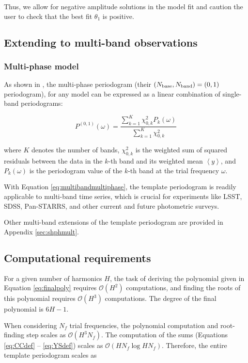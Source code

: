 \documentclass{aastex62}
\newcommand{\bigO}{\mathcal{O}}
\newcommand{\savg}[1]{\left<#1\right>}
\begin{document}
Thus, we allow for negative amplitude solutions in the model fit and caution
the user to check that the best fit $\theta_1$ is positive.


\subsection{Extending to multi-band observations}

\subsubsection{Multi-phase model}
\label{sec:multiband}
As shown in \cite{Vanderplas+Ivezic_2015}, the multi-phase periodogram (their
$(N_{\rm base}, N_{\rm band}) = (0, 1)$ periodogram), for any model can
be expressed as a linear combination of single-band periodograms:

\begin{equation}
\label{eq:multibandmultiphase}
P^{(0,1)}(\omega) = \frac{\sum_{k=1}^K\chi^2_{0, k}P_{k}(\omega)}{\sum_{k=1}^K\chi^2_{0,k}}
\end{equation}

\noindent where $K$ denotes the number of bands, $\chi^2_{0,k}$ is the weighted sum of squared
residuals between the data in the $k$-th band and its weighted mean $\savg{y}$, and $P_k(\omega)$ is
the periodogram value of the $k$-th band at the trial frequency $\omega$.

With Equation \ref{eq:multibandmultiphase}, the template periodogram is readily applicable to multi-band
time series, which is crucial for experiments like LSST, SDSS, Pan-STARRS, and other current
and future photometric surveys.

Other multi-band extensions of the template periodogram are provided in Appendix \ref{sec:shphmult}.

\subsection{Computational requirements}\label{sec:compreqs}

For a given number of harmonics $H$, the task of deriving
the polynomial given in Equation \ref{eq:finalpoly} requires $\bigO(H^2)$ computations,
and finding the roots of this polynomial requires $\bigO(H^3)$ computations. The degree of the final
polynomial is $6H - 1$.

When considering $N_f$ trial frequencies, the polynomial computation and root-finding
step scales as $\bigO(H^3N_f)$. The computation of the sums
(Equations \ref{eq:CCdef} -- \ref{eq:YSdef}) scales as $\bigO(HN_f\log HN_f)$.
Therefore, the entire template periodogram scales as
\end{document}
